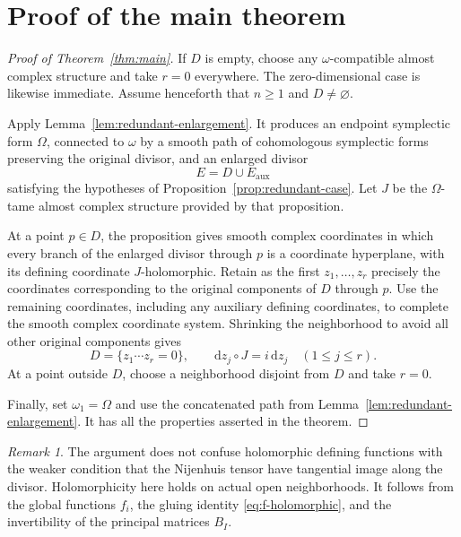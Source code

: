 \documentclass[11pt]{article}
\theoremstyle{definition}
\theoremstyle{remark}
\newtheorem{remark}[theorem]{Remark}
\newcommand{\dd}{\mathrm d}
\begin{document}

\section{Proof of the main theorem}

\begin{proof}[Proof of Theorem~\ref{thm:main}]
If $D$ is empty, choose any $\omega$-compatible almost complex
structure and take $r=0$ everywhere.  The zero-dimensional
case is likewise immediate.  Assume henceforth that $n\geq1$
and $D\neq\varnothing$.

Apply Lemma~\ref{lem:redundant-enlargement}.  It produces an
endpoint symplectic form $\Omega$, connected to $\omega$ by a
smooth path of cohomologous symplectic forms preserving the
original divisor, and an enlarged divisor
\[
E=D\cup E_{\mathrm{aux}}
\]
satisfying the hypotheses of
Proposition~\ref{prop:redundant-case}.  Let $J$ be the
$\Omega$-tame almost complex structure provided by that
proposition.

At a point $p\in D$, the proposition gives smooth complex
coordinates in which every branch of the enlarged divisor
through $p$ is a coordinate hyperplane, with its defining
coordinate $J$-holomorphic.  Retain as the first
$z_1,\ldots,z_r$ precisely the coordinates corresponding to
the original components of $D$ through $p$.  Use the remaining
coordinates, including any auxiliary defining coordinates, to
complete the smooth complex coordinate system.  Shrinking
the neighborhood to avoid all other original components gives
\[
D=\{z_1\cdots z_r=0\},\qquad
\dd z_j\circ J=i\,\dd z_j\quad(1\leq j\leq r).
\]
At a point outside $D$, choose a neighborhood disjoint from
$D$ and take $r=0$.

Finally, set $\omega_1=\Omega$ and use the concatenated path
from Lemma~\ref{lem:redundant-enlargement}.  It has all the
properties asserted in the theorem.
\end{proof}


\begin{remark}
The argument does not confuse holomorphic defining functions
with the weaker condition that the Nijenhuis tensor have
tangential image along the divisor.  Holomorphicity here holds
on actual open neighborhoods.  It follows from the global
functions $f_i$, the gluing identity
\eqref{eq:f-holomorphic}, and the invertibility of the principal
matrices $B_I$.
\end{remark}
\end{document}
